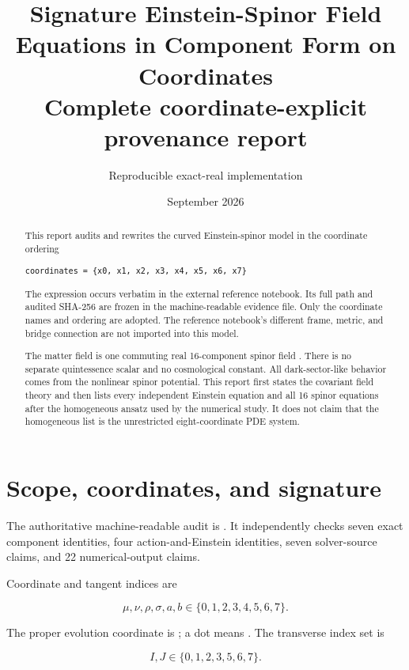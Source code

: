 \documentclass[11pt]{article}
\title{Signature \texttt{\detokenize{(4,4)}} Einstein-Spinor Field Equations in Component Form on Coordinates \texttt{\detokenize{{x0,...,x7}}}\\[0.5em]\large Complete coordinate-explicit provenance report}
\author{Reproducible exact-real implementation}
\date{September 2026}
\begin{document}
\maketitle
\tableofcontents
\newpage
\begin{abstract}
This report audits and rewrites the curved \texttt{} Einstein-spinor model in the coordinate ordering

\begin{Verbatim}[fontsize=\small]
coordinates = {x0, x1, x2, x3, x4, x5, x6, x7}
\end{Verbatim}

The expression occurs verbatim in the external \texttt{} reference notebook. Its full path and audited SHA-256 are frozen in the machine-readable evidence file. Only the coordinate names and ordering are adopted. The reference notebook's different frame, metric, and bridge connection are not imported into this model.

The matter field is one commuting real 16-component spinor field \texttt{}. There is no separate quintessence scalar and no cosmological constant. All dark-sector-like behavior comes from the nonlinear spinor potential. This report first states the covariant field theory and then lists every independent Einstein equation and all 16 spinor equations after the homogeneous ansatz used by the numerical study. It does not claim that the homogeneous list is the unrestricted eight-coordinate PDE system.

\end{abstract}

\section{Scope, coordinates, and signature}

The authoritative machine-readable audit is \texttt{}. It independently checks seven exact component identities, four action-and-Einstein identities, seven solver-source claims, and 22 numerical-output claims.

Coordinate and tangent indices are

\[
\mu,\nu,\rho,\sigma,a,b\in\{0,1,2,3,4,5,6,7\}.
\]

The proper evolution coordinate is \texttt{}; a dot means \texttt{}. The transverse index set is

\[
I,J\in\{0,1,2,3,5,6,7\}.
\]
\end{document}
